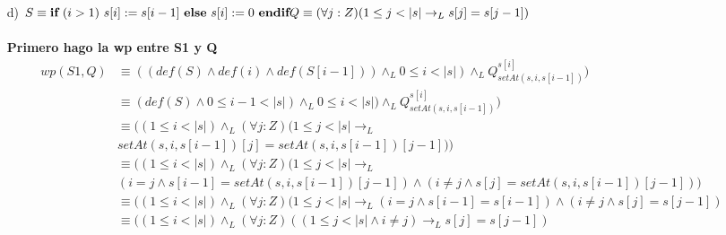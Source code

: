 \documentclass{article}
\begin{document}
{{\begin{itemize}
\begin{align}
        &\equiv (i>0 \land def(S) \land def(i) \land 0\leq i<|s| \land Q^{s[i]}_{setAt(S,i,0)} )\lor\\
        &(i\leq0 \land def(S)\land Q^{s[i]}_{s[0]} )\\
        &\equiv (0< i<|s| \land (\forall j :Z)(0 \leq j < |s| \to_L setAt(s,i,0) \geq 0) )\lor\\
        &(i\leq0 \land (\forall j :Z)(0 \leq j < |s| \to_L s[0] \geq 0) )\\
        &\equiv (0< i<|s| \land (\forall j :Z)(0 \leq j < |s| \to_L (i=j \land s[i]\geq0)\land(i\neq j \land s[j]\geq0) )\lor\\
        &(i\leq0 \land (\forall j :Z)(0 \leq j < |s| \to_L 0 \geq 0) )\\
        &\equiv (0< i<|s| \land (\forall j :Z)(0 \leq j < |s| \to_L (i=j \land \textit{True})\land(i\neq j \land s[j]\geq0) )\lor\\
        &(i\leq0 \land \textit{True} )\\
        &\equiv (0< i<|s| \land (\forall j :Z)((0 \leq j < |s| \land i\neq j)\to_L s[j]\geq0) )
    \end{align}
    \item [d) ] $S\equiv \textbf{if}\ (i>1)\ s[i]:=s[i-1]\ \textbf{else}\ s[i]:=0\ \textbf{endif}\\
    Q \equiv (\forall j :Z)(1 \leq j < |s| \to_L s[j]=s[j-1])$\\\\
    \textbf{Primero hago la wp entre S1 y Q}\\
    \setcounter{equation}{0}
    \small{\begin{align}
        wp(S1,Q)&\equiv((def(S) \land def(i)\land def(S[i-1])) \land_L 0\leq i<|s|) \land_L Q^{s[i]}_{setAt(s,i,s[i-1])})\\
        &\equiv(def(S)\land 0\leq i-1<|s|) \land_L 0\leq i<|s|) \land_L Q^{s[i]}_{setAt(s,i,s[i-1])})\\
        &\equiv((1\leq i<|s|) \land_L (\forall j :Z)(1 \leq j < |s| \to_L\\\nonumber& setAt(s,i,s[i-1])[j]=setAt(s,i,s[i-1])[j-1]))\\
        &\equiv((1\leq i<|s|) \land_L (\forall j :Z)(1 \leq j < |s| \to_L\\\nonumber& (i=j \land s[i-1]=setAt(s,i,s[i-1])[j-1])\land(i\neq j \land s[j]=setAt(s,i,s[i-1])[j-1]))\\
        &\equiv((1\leq i<|s|) \land_L (\forall j :Z)(1 \leq j < |s| \to_L (i=j \land s[i-1]=s[i-1])\land(i\neq j \land s[j]=s[j-1])\\
        &\equiv ((1\leq i<|s|) \land_L (\forall j :Z)((1 \leq j < |s| \land i\neq j)\to_L s[j]=s[j-1])\\
    \end{align}}
    

\end{itemize}}}
\end{document}
